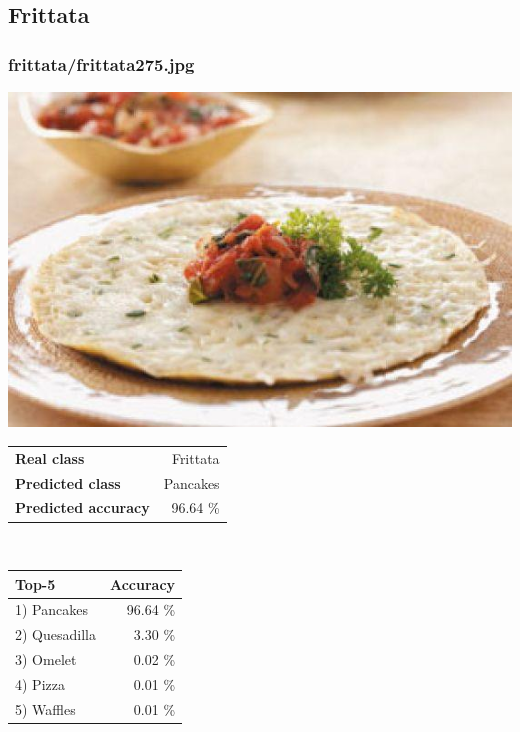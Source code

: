 \subsection{Frittata}
    
\subsubsection{frittata/frittata275.jpg}

\begin{minipage}[t]{0.4\textwidth}
	\vspace{0pt}
	\includegraphics[width=\linewidth]{images/evaluation-images/frittata/frittata275.jpg}
\end{minipage}
\hfill
\begin{minipage}[t]{0.5\textwidth}
	\vspace{0pt}\raggedright
	\begin{tabularx}{\textwidth}{X r}
		\small \textbf{Real class} & \small Frittata\\
		\small \textbf{Predicted class} & \small Pancakes\\
		\small \textbf{Predicted accuracy} & \small 96.64 \%
    \end{tabularx}\\
    
    \vspace{6pt}
	\begin{tabularx}{\textwidth}{X r}
        \small \textbf{Top-5} & \small \textbf{Accuracy} \\
        \hline
		\small 1) Pancakes & \small 96.64 \%\\\small 2) Quesadilla & \small 3.30 \%\\\small 3) Omelet & \small 0.02 \%\\\small 4) Pizza & \small 0.01 \%\\\small 5) Waffles & \small 0.01 \%
    \end{tabularx}
\end{minipage}
    
